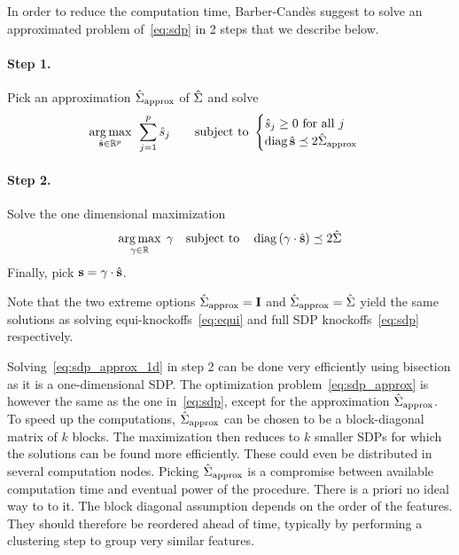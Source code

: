 In order to reduce the computation time,
Barber-Candès suggest to solve an approximated problem of~\ref{eq:sdp} in 2 steps that we describe below.
\paragraph*{Step 1.}
Pick an approximation $\hat{\Sigma}_\text{approx}$ of $\hat{\Sigma}$ and solve
\begin{equation}\label{eq:sdp_approx}
    \underset{\hat{\mathbf{s}} \in \mathbb{R}^p}{\operatorname*{arg\,max}}\;\,
    \sum_{j = 1}^p \hat{s}_j
    \qquad
    \text{subject to } \begin{cases}
        \hat{s}_j \geq 0\text{ for all } j\\
        \operatorname*{diag} \hat{\mathbf{s}} \preceq 2\hat{\Sigma}_\text{approx}
    \end{cases}
\end{equation}
\paragraph*{Step 2.}
Solve the one dimensional maximization
\begin{equation}\label{eq:sdp_approx_1d}
    \underset{\gamma \in \mathbb{R}}{\operatorname*{arg\,max}}\;\,\gamma
    \quad\text{subject to}\quad
    \operatorname*{diag}\left( \gamma \cdot \hat{\mathbf{s}} \right) \preceq 2\hat{\Sigma}
\end{equation}
Finally, pick $\mathbf{s} = \gamma \cdot \hat{\mathbf{s}}$.

\begin{remark}
    Note that the two extreme options $\hat{\Sigma}_\text{approx} = \mathbf{I}$ and $\hat{\Sigma}_\text{approx} = \hat{\Sigma}$ yield
    the same solutions as solving equi-knockoffs~\ref{eq:equi} and full SDP knockoffs~\ref{eq:sdp} respectively.
\end{remark}

Solving~\ref{eq:sdp_approx_1d} in step 2 can be done very efficiently using bisection as it is a one-dimensional SDP\@.
The optimization problem~\ref{eq:sdp_approx} is however the same as the one in~\ref{eq:sdp},
except for the approximation $\hat{\Sigma}_\text{approx}$.
To speed up the computations,
$\hat{\Sigma}_\text{approx}$ can be chosen to be a block-diagonal matrix of $k$ blocks.
The maximization then reduces to $k$ smaller SDPs for which the solutions can be found more efficiently.
These could even be distributed in several computation nodes.
Picking $\hat{\Sigma}_\text{approx}$ is a compromise between available computation time and eventual power of the procedure.
There is a priori no ideal way to to it.
The block diagonal assumption depends on the order of the features.
They should therefore be reordered ahead of time,
typically by performing a clustering step to group very similar features.


